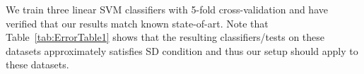 \documentclass[11pt]{article} %
\begin{document}
We train three linear SVM classifiers with 5-fold cross-validation and have verified that our results match known state-of-art. Note that Table~\ref{tab:ErrorTable1} shows that the resulting classifiers/tests on these datasets approximately satisfies SD condition and thus our setup should apply to these datasets. 
%
%
%
%
%
\end{document}
